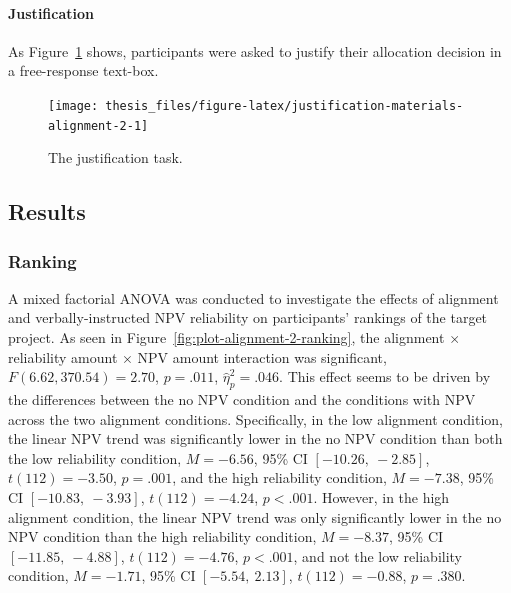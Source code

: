\documentclass[a4paper, nobind, dvipsnames]{templates/ociamthesis}
\theoremstyle{definition}
\theoremstyle{definition}
\theoremstyle{definition}
\theoremstyle{definition}
\theoremstyle{remark}
\begin{document}
\hypertarget{justification-materials-alignment-2}{%
\paragraph{Justification}\label{justification-materials-alignment-2}}

As Figure~\ref{fig:justification-materials-alignment-2} shows, participants were asked to justify their allocation decision in a free-response text-box.



\begin{figure}
\texttt{[image: thesis\_files/figure-latex/justification-materials-alignment-2-1]} \caption{The justification task.}\label{fig:justification-materials-alignment-2}
\end{figure}

\hypertarget{results-alignment-2-appendix}{%
\subsection{Results}\label{results-alignment-2-appendix}}

\hypertarget{ranking}{%
\subsubsection{Ranking}\label{ranking}}

A mixed factorial ANOVA was conducted to investigate the effects of alignment
and verbally-instructed NPV reliability on participants' rankings of the
target project. As seen in Figure~\ref{fig:plot-alignment-2-ranking}, the
alignment \(\times\) reliability amount \(\times\) NPV amount interaction was
significant,
\(F(6.62, 370.54) = 2.70\), \(p = .011\), \(\hat{\eta}^2_p = .046\). This
effect seems to be driven by the differences between the no NPV condition and
the conditions with NPV across the two alignment conditions. Specifically, in
the low alignment condition, the linear NPV trend was significantly lower in the
no NPV condition than both the low reliability condition,
\(M = -6.56\), 95\% CI \([-10.26,~-2.85]\), \(t(112) = -3.50\), \(p = .001\), and the high
reliability condition, \(M = -7.38\), 95\% CI \([-10.83,~-3.93]\), \(t(112) = -4.24\), \(p < .001\).
However, in the high alignment condition, the linear NPV trend was only
significantly lower in the no NPV condition than the high reliability condition,
\(M = -8.37\), 95\% CI \([-11.85,~-4.88]\), \(t(112) = -4.76\), \(p < .001\), and not the low
reliability condition, \(M = -1.71\), 95\% CI \([-5.54,~2.13]\), \(t(112) = -0.88\), \(p = .380\).
\end{document}
